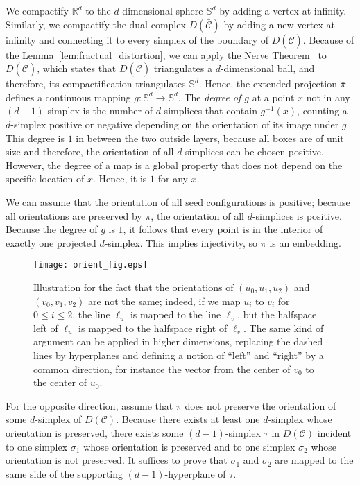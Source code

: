 \documentclass[12pt]{article}
\newcommand{\R}{\mathbb{R}}
\renewcommand{\S}{\mathbb{S}}
\newcommand{\partition}{\mathcal{C}}
\begin{document}
\begin{appendix}
We compactify $\R^d$ to the $d$-dimensional sphere $\S^d$ by adding a vertex at infinity.
Similarly, we compactify the dual complex $D(\bar{\partition})$ by adding a new vertex at infinity
and connecting it to every simplex of the boundary of $D(\bar{\partition})$.
Because of the Lemma~\ref{lem:fractual_distortion}, 
we can apply the Nerve Theorem~\cite{eh-computational} to $D(\bar{\partition})$, which states
that $D(\bar{\partition})$ triangulates a $d$-dimensional ball, and therefore, its compactification
triangulates $\S^d$.
Hence, the extended projection $\bar{\pi}$ defines a continuous mapping $g:\S^d\rightarrow\S^d$.
The \emph{degree of $g$} at a point $x$ not in any $(d-1)$-simplex is the number of
$d$-simplices that contain $g^{-1}(x)$, counting a $d$-simplex positive or negative
depending on the orientation of its image under $g$. This degree is $1$ in between the two
outside layers, because all boxes are of unit size and therefore, the orientation
of all $d$-simplices can be chosen positive. However, the degree of a map is a global
property that does not depend on the specific location of $x$. Hence, it is $1$ for any $x$.
 
We can assume that the orientation of all seed configurations is positive; because
all orientations are preserved by $\pi$,
the orientation of all $d$-simplices is positive. Because the degree of $g$ is $1$, it
follows that every point is in the interior of exactly one projected $d$-simplex. This implies injectivity, 
so $\pi$ is an embedding.

\begin{figure}[htb]
\centering
\texttt{[image: orient\_fig.eps]}
\caption{Illustration for the fact that the orientations of $(u_0,u_1,u_2)$ and $(v_0,v_1,v_2)$
         are not the same; indeed, if we map $u_i$ to $v_i$ for $0\leq i\leq 2$, the line $\ell_u$
         is mapped to the line $\ell_v$, but the halfspace left of $\ell_u$ is mapped to
         the halfspace right of $\ell_v$. The same kind of argument can be applied
         in higher dimensions, replacing the dashed lines by hyperplanes and defining a notion
         of ``left'' and ``right'' by a common direction, for instance the vector from
         the center of $v_0$ to the center of $u_0$.}
\label{fig:orient_fig}
\end{figure}


For the opposite direction, assume that $\pi$ does not preserve the orientation 
of some $d$-simplex of $D(\partition)$. Because there exists at least one $d$-simplex
whose orientation is preserved, there exists some $(d-1)$-simplex $\tau$ in $D(\partition)$
incident to one simplex $\sigma_1$ whose orientation is preserved and to one 
simplex $\sigma_2$ whose orientation is not preserved.
It suffices to prove that $\sigma_1$ and $\sigma_2$ are mapped to the same side
of the supporting $(d-1)$-hyperplane of $\tau$.


\end{appendix}
\end{document}
